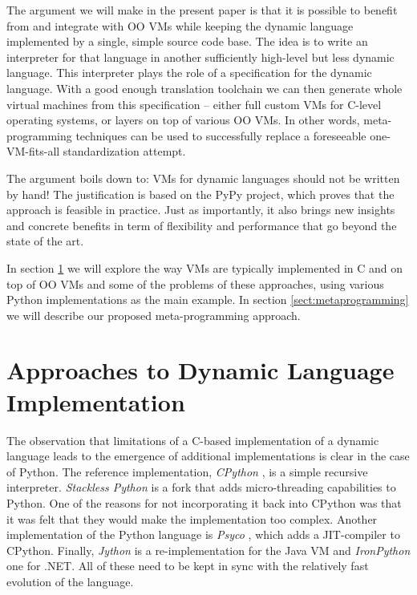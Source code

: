 \documentclass{llncs}
\begin{document}
The argument we will make in the present paper is that it is possible to
benefit from and integrate with OO VMs while keeping the dynamic
language implemented by a single, simple source code base.  The idea is
to write an interpreter for that language in another sufficiently
high-level but less dynamic language.  This interpreter plays the role
of a specification for the dynamic language.  With a good enough
translation toolchain we can then generate whole virtual machines from
this specification -- either full custom VMs for C-level operating
systems, or layers on top of various OO VMs.  In other words,
meta-programming techniques can be used to successfully replace a
foreseeable one-VM-fits-all standardization attempt.

The argument boils down to: VMs for dynamic languages should not be
written by hand!  The justification is based on the
PyPy project, which proves that the approach is
feasible in practice.  Just as importantly, it also brings new insights
and concrete benefits in term of flexibility and performance that go
beyond the state of the art.

In section \ref{sect:approaches} we will explore the way VMs are typically
implemented in C and on top of OO VMs and some of the problems of these
approaches, using various Python implementations as the main example. In
section \ref{sect:metaprogramming} we will describe our proposed
meta-programming approach.


\section{Approaches to Dynamic Language Implementation}
\label{sect:approaches}

\def\implname#1{\emph{#1}}

The observation that limitations of a C-based implementation of a dynamic
language leads to the emergence of additional implementations is clear
in the case of Python.  The reference implementation, \implname{CPython}
\cite{cpy251}, is a simple recursive interpreter.  \implname{Stackless
Python} \cite{stackless} is a fork that adds micro-threading
capabilities to Python. One of the reasons for not incorporating it back
into CPython was that it was felt that they would make the
implementation too complex. Another implementation of the Python
language is \implname{Psyco} \cite{psyco-software}, which adds a
JIT-compiler to CPython.  Finally, \implname{Jython} is a
re-implementation for the Java VM and \implname{IronPython} one for
.NET.  All of these need to be kept in sync with the relatively fast
evolution of the language.
\end{document}
